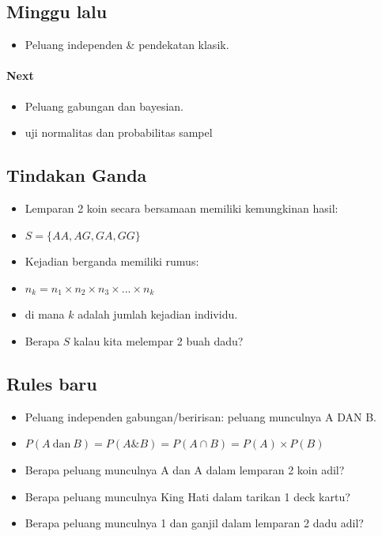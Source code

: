 \documentclass[
  letterpaper,
  DIV=11,
  numbers=noendperiod]{scrartcl}
\let\oldparagraph\paragraph
\renewcommand{\paragraph}[1]{\oldparagraph{#1}\mbox{}}
\providecommand{\tightlist}{%
  \setlength{\itemsep}{0pt}\setlength{\parskip}{0pt}}\usepackage{longtable,booktabs,array}
\begin{document}
\hypertarget{minggu-lalu-1}{%
\subsection{Minggu lalu}\label{minggu-lalu-1}}

\begin{itemize}
\tightlist
\item
  Peluang independen \& pendekatan klasik.
\end{itemize}

\hypertarget{next-1}{%
\paragraph{Next}\label{next-1}}

\begin{itemize}
\tightlist
\item
  Peluang gabungan dan bayesian.
\item
  uji normalitas dan probabilitas sampel
\end{itemize}

\hypertarget{tindakan-ganda}{%
\subsection{Tindakan Ganda}\label{tindakan-ganda}}

\begin{itemize}
\item
  Lemparan 2 koin secara bersamaan memiliki kemungkinan hasil:
\item
  \(S=\{AA,AG,GA,GG\}\)
\item
  Kejadian berganda memiliki rumus:
\item
  \(n_k=n_1 \times n_2 \times n_3 \times ... \times n_k\)
\item
  di mana \(k\) adalah jumlah kejadian individu.
\item
  Berapa \(S\) kalau kita melempar 2 buah dadu?
\end{itemize}

\hypertarget{rules-baru}{%
\subsection{Rules baru}\label{rules-baru}}

\begin{itemize}
\item
  Peluang independen gabungan/beririsan: peluang munculnya A DAN B.
\item
  \(P(A \ \text{dan} \ B)=P(A\&B) = P(A \cap B) = P(A) \times P(B)\)
\item
  Berapa peluang munculnya A dan A dalam lemparan 2 koin adil?
\item
  Berapa peluang munculnya King Hati dalam tarikan 1 deck kartu?
\item
  Berapa peluang munculnya 1 dan ganjil dalam lemparan 2 dadu adil?
\end{itemize}
\end{document}

